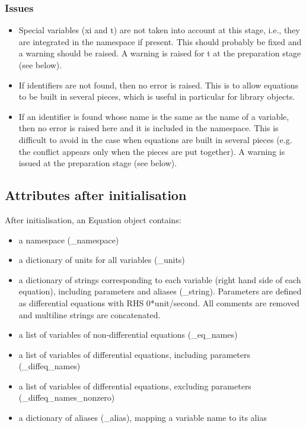 \documentclass[letterpaper,10pt,english]{manual}
\begin{document}
\subsubsection{Issues}
\begin{itemize}
\item {} 
Special variables (xi and t) are not taken into account
at this stage, i.e., they are integrated in the namespace if present.
This should probably be fixed and a warning should be raised.
A warning is raised for t at the preparation stage (see below).

\item {} 
If identifiers are not found, then no error is raised. This is to allow
equations to be built in several pieces, which is useful in particular for
library objects.

\item {} 
If an identifier is found whose name is the same as the name of a variable,
then no error is raised here and it is included in the namespace. This is difficult
to avoid in the case when equations are built in several pieces (e.g. the conflict
appears only when the pieces are put together). A warning is issued at the
preparation stage (see below).

\end{itemize}


\subsection{Attributes after initialisation}

After initialisation, an Equation object contains:
\begin{itemize}
\item {} 
a namespace (\_namespace)

\item {} 
a dictionary of units for all variables (\_units)

\item {} 
a dictionary of strings corresponding to each variable (right hand side of each
equation), including parameters and aliases (\_string). Parameters are defined as differential
equations with RHS 0*unit/second. All comments are removed and multiline strings are
concatenated.

\item {} 
a list of variables of non-differential equations (\_eq\_names)

\item {} 
a list of variables of differential equations, including parameters (\_diffeq\_names)

\item {} 
a list of variables of differential equations, excluding parameters (\_diffeq\_names\_nonzero)

\item {} 
a dictionary of aliases (\_alias), mapping a variable name to its alias

\end{itemize}
\end{document}
